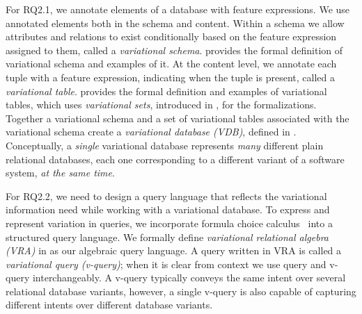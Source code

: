For RQ2.1, we annotate elements of a database with feature expressions.
We use annotated elements both in the schema and content.
Within a schema we allow attributes and relations to exist 
conditionally based on the feature expression assigned to them, called a \emph{variational schema}.
 provides the formal definition of variational schema and examples of it.
At the content level, we annotate each tuple with a feature expression, indicating when the tuple 
is present, called a \emph{variational table}.
 provides the formal definition and examples of variational tables,
which uses \emph{variational sets}, introduced in , for the formalizations.
%
Together a variational schema and a set of variational tables associated with the 
variational schema create a \emph{variational database (VDB)}, defined in .
Conceptually, a  \emph{single} variational database represents \emph{many}
different plain relational
databases, each one corresponding to a different variant of a software system,
\emph{at the same time}.



\begin{comment}
The variational nature of a VDB requires a query language that
accounts for variation directly.
To express and represent variation in queries,
we incorporate choice calculus~\cite{Walk13thesis, EW11tosem}  into a 
structured query language. We formally define 
\emph{variational relational algebra (VRA)} in \secref{vrel-alg}
as our algebraic query language.
A query written in VRA is called a \emph{variational query (v-query)};
when it is clear from context we use query and v-query interchangeably. 
A v-query typically conveys the same intent over several 
relational database variants, however, a single v-query is also capable of capturing different 
intents over different database variants.
Consequently, the expressiveness of v-queries may cause them to be 
more complicated than relational queries, discussed in \secref{type-sys}. 
Hence, we introduce a 
\emph{type system} for VRA that statically checks if a 
v-query conforms to the underlying v-schema and encoded variability within the VDB.
Finally, we close out this section by providing a set of rules in \secref{var-min} 
for reducing a query's variation.

\end{comment}

For RQ2.2, we need to design a query language that reflects the variational 
information need while working with a variational database. 
To express and represent variation in queries,
we incorporate formula choice calculus~\cite{HW16fosd}  into a 
structured query language. We formally define 
\emph{variational relational algebra (VRA)} in 
as our algebraic query language.
A query written in VRA is called a \emph{variational query (v-query)};
when it is clear from context we use query and v-query interchangeably. 
A v-query typically conveys the same intent over several 
relational database variants, however, a single v-query is also capable of capturing different 
intents over different database variants.


